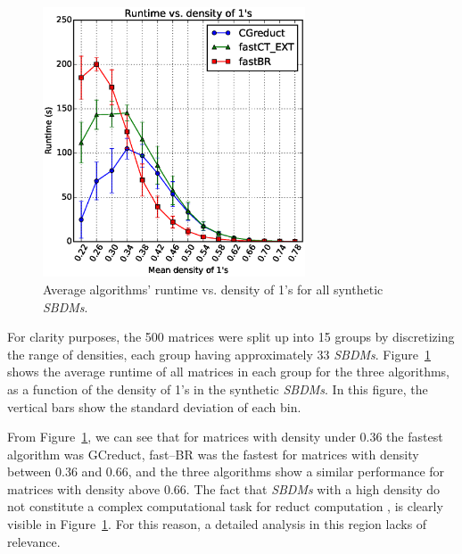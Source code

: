 \documentclass[number,preprint,review,12pt]{elsarticle}
\begin{document}
	\begin{figure}[htb]
		\begin{center}
			\includegraphics[height=8cm]{overal.eps}
		\end{center}
		\caption{Average algorithms' runtime vs. density of 1's for all synthetic \textit{SBDMs}.}
		\label{fig:scattDensity}
	\end{figure}	

	For clarity purposes, the 500 matrices were split up into 15 groups by discretizing the range of densities, each group having approximately 33 \textit{SBDMs}. Figure~\ref{fig:scattDensity} shows the average runtime of all  matrices in each group for the three algorithms, as a function of the density of 1's in the synthetic \textit{SBDMs}. In this figure, the vertical bars show the standard deviation of each bin. 
		
	From Figure~\ref{fig:scattDensity}, we can see that for matrices with density under 0.36  the fastest algorithm was GCreduct, fast--BR was the fastest for matrices with density between 0.36 and 0.66, and the three algorithms show a similar performance for matrices with density above 0.66. The fact that \textit{SBDMs} with a high density do not constitute a complex computational task for reduct computation \citep{Rojas12}, is clearly visible in Figure~\ref{fig:scattDensity}. For this reason, a detailed analysis in this region lacks of relevance.
		
\end{document}
